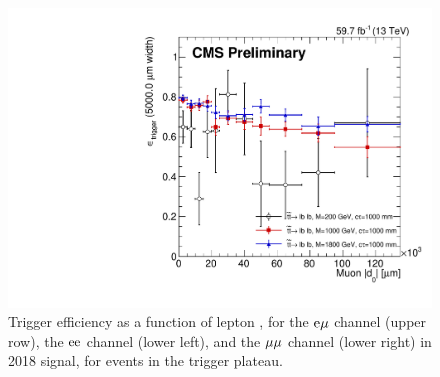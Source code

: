 \begin{figure}[hbtp]
\includegraphics[scale=0.3]{figures/systematics/trig_eff/mumu_2018/muonAbsD0_100000um_variableBins_coarse.pdf}
\caption{Trigger efficiency as a function of lepton \ad, for the $\mathrm{e}{\mu}$ channel (upper row), the $\mathrm{e}\mathrm{e}$ channel (lower left), and the ${\mu}{\mu}$ channel (lower right) in 2018 signal, for events in the trigger \pt plateau.}
\label{trig_eff_d0}
\end{figure}